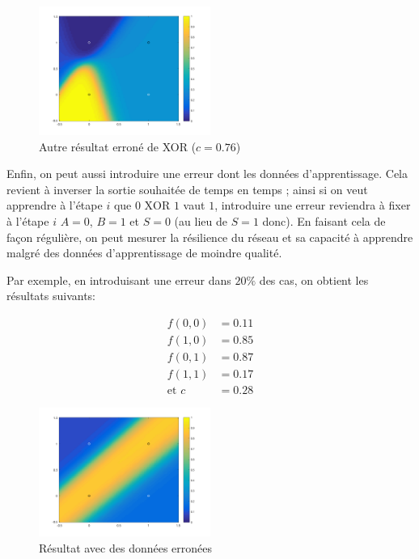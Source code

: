 \begin{figure}[!ht]
\begin{center}
  \includegraphics[width=0.5\textwidth]{images/xor3.png}
\end{center}
\caption{Autre résultat erroné de XOR ($c = 0.76$)}
\end{figure}

Enfin, on peut aussi introduire une erreur dont les données d'apprentissage. Cela revient à inverser la sortie souhaitée de temps en temps ; ainsi si on veut apprendre à l'étape $i$ que $0 \text{ XOR } 1$ vaut $1$, introduire une erreur reviendra à fixer à l'étape $i$ $A = 0$, $B = 1$ et $S = 0$ (au lieu de $S = 1$ donc). En faisant cela de façon régulière, on peut mesurer la résilience du réseau et sa capacité à apprendre malgré des données d'apprentissage de moindre qualité.

Par exemple, en introduisant une erreur dans $20\%$ des cas, on obtient les résultats suivants:

\[\begin{split}
f(0, 0) &= 0.11 \\
f(1, 0) &= 0.85 \\
f(0, 1) &= 0.87 \\
f(1, 1) &= 0.17 \\
\text{et }c &= 0.28
\end{split}\]

\begin{figure}[!ht]
\begin{center}
  \includegraphics[width=0.5\textwidth]{images/xor4.png}
\end{center}
\caption{Résultat avec des données erronées}
\end{figure}

